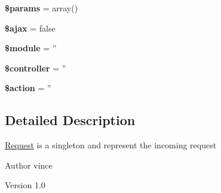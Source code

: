 \begin{DoxyCompactItemize}
\item 
\hypertarget{class_anemo_1_1_application_1_1_http_1_1_request_afe68e6fbe7acfbffc0af0c84a1996466}{
{\bfseries \$params} = array()}
\label{class_anemo_1_1_application_1_1_http_1_1_request_afe68e6fbe7acfbffc0af0c84a1996466}

\item 
\hypertarget{class_anemo_1_1_application_1_1_http_1_1_request_acf9b4eabceb162a0d757e5665fa38acb}{
{\bfseries \$ajax} = false}
\label{class_anemo_1_1_application_1_1_http_1_1_request_acf9b4eabceb162a0d757e5665fa38acb}

\item 
\hypertarget{class_anemo_1_1_application_1_1_http_1_1_request_ac531301c55a8d8b6c7613597218ff482}{
{\bfseries \$module} = ''}
\label{class_anemo_1_1_application_1_1_http_1_1_request_ac531301c55a8d8b6c7613597218ff482}

\item 
\hypertarget{class_anemo_1_1_application_1_1_http_1_1_request_a388ef7b1db5e6f728e63cee704ce6e23}{
{\bfseries \$controller} = ''}
\label{class_anemo_1_1_application_1_1_http_1_1_request_a388ef7b1db5e6f728e63cee704ce6e23}

\item 
\hypertarget{class_anemo_1_1_application_1_1_http_1_1_request_aa698a3e72116e8e778be0e95d908ee30}{
{\bfseries \$action} = ''}
\label{class_anemo_1_1_application_1_1_http_1_1_request_aa698a3e72116e8e778be0e95d908ee30}

\end{DoxyCompactItemize}


\subsection{Detailed Description}
\hyperlink{class_anemo_1_1_application_1_1_http_1_1_request}{Request} is a singleton and represent the incoming request \begin{DoxyAuthor}{Author}
vince 
\end{DoxyAuthor}
\begin{DoxyVersion}{Version}
1.0 
\end{DoxyVersion}


